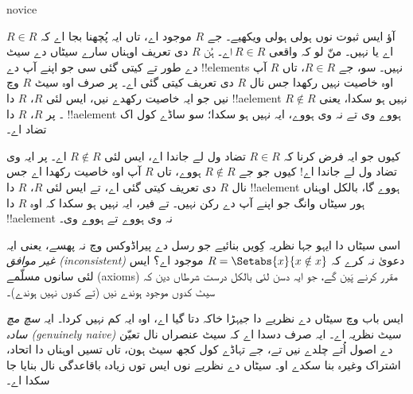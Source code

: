 \documentclass[../../../include/open-logic-section]{subfiles}
\begin{document}
\begin{tagblock}{novice}
\begin{explain}
آؤ ایس ثبوت نوں ہولی ہولی ویکھیے۔ جے $R$ موجود اے، تاں ایہ پُچھنا بجا اے
کہ $R \in R$ اے یا نہیں۔ منّ لو کہ واقعی $R \in R$ اے۔ ہُن $R$ دی
تعریف اوہناں سارے سیٹاں دے سیٹ دے طور تے کیتی گئی سی جو اپنے آپ دے
!!{element}s نہیں۔ سو، جے $R \in R$، تاں $R$ آپ اوہ خاصیت نہیں رکھدا
جس نال $R$ دی تعریف کیتی گئی اے۔ پر صرف اوہ سیٹ $R$ وچ نیں جو ایہ
خاصیت رکھدے نیں، ایس لئی $R$، $R$ دا !!a{element} نہیں ہو سکدا، یعنی
$R \notin R$۔ پر $R$، $R$ دا !!a{element} ہووے وی تے نہ وی ہووے، ایہ
نہیں ہو سکدا؛ سو ساڈے کول اک تضاد اے۔

کیوں جو ایہ فرض کرنا کہ $R \in R$ تضاد ول لے جاندا اے، ایس لئی
$R \notin R$ اے۔ پر ایہ وی تضاد ول لے جاندا اے!{} کیوں جو جے $R \notin R$
ہووے، تاں $R$ آپ اوہ خاصیت رکھدا اے جس نال $R$ دی تعریف کیتی گئی اے،
تے ایس لئی $R$، $R$ دا !!a{element} ہووے گا، بالکل اوہناں ہور سیٹاں
وانگ جو اپنے آپ دے رکن نہیں۔ تے فیر، ایہ نہیں ہو سکدا کہ اوہ $R$ دا
!!a{element} نہ وی ہووے تے ہووے وی۔
\end{explain}
\end{tagblock}

\begin{digress}
اسی سیٹاں دا ایہو جہا نظریہ کِویں بنائیے جو رسل دے پیراڈوکس وچ نہ پھسے،
یعنی ایہ \emph{غیر موافق (inconsistent)} دعویٰ نہ کرے کہ
$R = \Setabs{x}{x \notin x}$ موجود اے؟ ایس لئی سانوں مسلّمے (axioms)
مقرر کرنے پَین گے، جو ایہ دسن لئی بالکل
درست شرطاں دین کہ سیٹ کدوں موجود ہوندے نیں (تے کدوں نہیں ہوندے)۔

ایس باب وچ سیٹاں دے نظریے دا جیہڑا خاکہ دتا گیا اے، اوہ ایہ کم نہیں کردا۔
ایہ \emph{سچ مچ سادہ (genuinely naive)} سیٹ نظریہ اے۔ ایہ صرف دسدا اے کہ سیٹ عنصراں نال
تعیّن دے اصول اُتے چلدے نیں تے، جے تہاڈے کول کجھ سیٹ ہون، تاں تسیں اوہناں
دا اتحاد، اشتراک وغیرہ بنا سکدے او۔ سیٹاں دے نظریے نوں ایس توں زیادہ
باقاعدگی نال بنایا جا سکدا اے۔ 
\end{digress}
\end{document}
